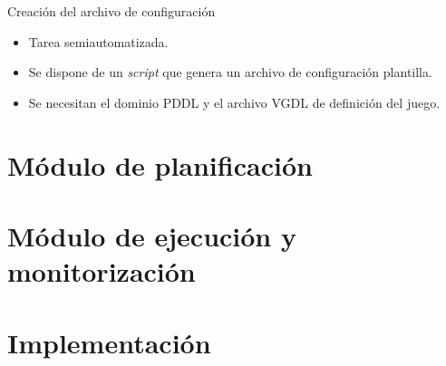 \documentclass[11pt]{beamer}    %
\begin{document}
    \begin{frame}{Creación del archivo de configuración}
        \begin{itemize}
            \item Tarea semiautomatizada.
            \item Se dispone de un \textit{script} que genera un archivo de configuración
            plantilla.
            \item Se necesitan el dominio PDDL y el archivo VGDL de definición del juego. 
        \end{itemize}

    \end{frame}
    \section{Módulo de planificación}

    \section{Módulo de ejecución y monitorización}


    \section{Implementación}
\end{document}
